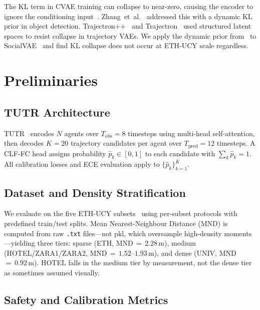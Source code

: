\documentclass[journal]{IEEEtran}
\makeatletter
\newcommand{\etal}{et~al.\@}
\makeatother
\begin{document}
The KL term in CVAE training can collapse to near-zero, causing the
encoder to ignore the conditioning
input~\cite{lucas2019elbo}.
Zhang~\etal~\cite{zhang2025openworld} addressed this with a dynamic KL
prior in object detection.
Trajectron++~\cite{salzmann2020trajectron} and
Trajectron~\cite{ivanovic2019trajectron} used structured latent spaces
to resist collapse in trajectory VAEs.
We apply the dynamic prior from~\cite{zhang2025openworld} to
SocialVAE~\cite{xu2022socialvae} and find KL collapse does not occur
at ETH-UCY scale regardless.

\section{Preliminaries}
\label{sec:prelim}

\subsection{TUTR Architecture}

TUTR~\cite{shi2023tutr} encodes $N$ agents over $T_\text{obs}{=}8$
timesteps using multi-head self-attention, then decodes $K{=}20$
trajectory candidates per agent over $T_\text{pred}{=}12$ timesteps.
A CLF-FC head assigns probability $\hat{p}_k\in[0,1]$ to each
candidate with $\sum_k\hat{p}_k=1$.
All calibration losses and ECE evaluation apply to
$\{\hat{p}_k\}_{k=1}^K$.

\subsection{Dataset and Density Stratification}

We evaluate on the five ETH-UCY
subsets~\cite{pellegrini2009eth,lerner2007ucy} using per-subset
protocols with predefined train/test splits.
Mean Nearest-Neighbour Distance (MND) is computed from raw
\texttt{.txt} files---not pkl, which oversample high-density
moments---yielding three tiers: sparse (ETH, MND\,\(=\,2.28\)\,m),
medium (HOTEL/ZARA1/ZARA2, MND\,\(=\,1.52\)--\(1.93\)\,m), and
dense (UNIV, MND\,\(=\,0.92\)\,m).
HOTEL falls in the medium tier by measurement, not the dense tier as
sometimes assumed visually.

\subsection{Safety and Calibration Metrics}
\end{document}
